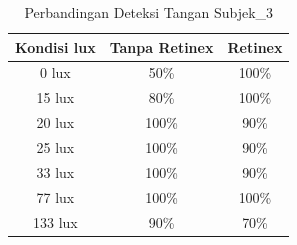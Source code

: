 \begin{table}[H]
	\caption{Perbandingan Deteksi Tangan Subjek\_3 }
	\vspace{0cm}
	\centering
	\begin{tabular}{|c|c|c|}
		\hline Kondisi lux &  Tanpa Retinex &Retinex \\
		\hline  0 lux &50\% &100\%\\
		\hline 15 lux &80\% &100\% \\
		\hline 20 lux &100\% &90\% \\
		\hline 25 lux &100\% &90\% \\
		\hline 33 lux &100\% &90\% \\
		\hline 77 lux &100\% &100\% \\
		\hline 133 lux& 90\% & 70\% \\
		\hline
	\end{tabular}
\end{table}
